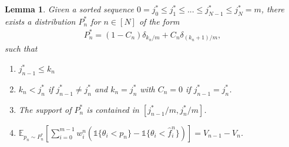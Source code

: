 \documentclass{article}
\newtheorem{lemma}{Lemma}
\newcommand{\indi}[1]{\mathds{1}\{#1\}}
\newcommand{\E}{\mathbb{E}}
\begin{document}
\begin{lemma} \label{lem:Pn_def}
Given a sorted sequence $0=j_0^* \leq j_1^* \leq ... \leq j_{N-1}^* \leq j_N^* = m$, there exists a distribution $P_n^*$ for $n \in [N]$ of the form
\begin{align}\label{eq:Pn_def}
P_n^* = (1-C_n)\delta_{k_n / m} + C_n\delta_{(k_n+1)/m},
\end{align}
such that 
\begin{enumerate}
  \item $j_{n-1}^* \leq k_n$
  \item $k_n < j_n^*$ if $j_{n-1}^* \neq j_n^*$ and $k_n = j_n^*$ with $C_n=0$ if $j_{n-1}^* = j_n^*$.
  \item The support of $P_n^*$ is contained in $[j_{n-1}^*/m, j_n^*/m]$.
  \item $\E_{p_n \sim P_n^*} \left[ \sum_{i=0}^{m-1} w_i^n \left( \indi{\theta_i < p_n} - \indi{\theta_i < \hat{f}_i^n} \right) \right] = V_{n-1}-V_n$.
\end{enumerate}
\end{lemma}
\end{document}
